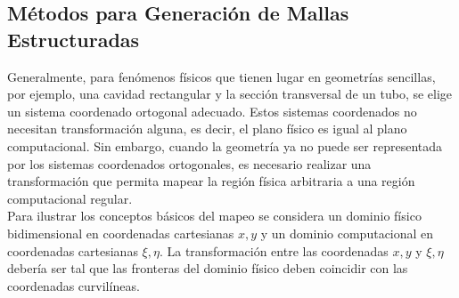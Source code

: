 \documentclass[11pt,letterpaper]{article}
\begin{document}
\subsection{Métodos para Generación de Mallas Estructuradas}

Generalmente, para fen\'omenos f\'isicos que tienen lugar en geometr\'ias sencillas, por ejemplo, una cavidad rectangular y la secci\'on transversal de un tubo, se elige un sistema coordenado ortogonal adecuado. Estos sistemas coordenados no necesitan transformación alguna, es decir, el plano físico es igual al plano computacional. Sin embargo, cuando la geometría ya no puede ser representada por los sistemas coordenados ortogonales, es necesario realizar una transformaci\'on que permita mapear la regi\'on f\'isica arbitraria a una regi\'on computacional regular.\\

Para ilustrar los conceptos b\'asicos del mapeo se considera un dominio físico bidimensional en coordenadas cartesianas $x,y$ y un dominio computacional en coordenadas cartesianas $\xi,\eta$. La transformaci\'on entre las coordenadas $x,y$ y $\xi,\eta$ debería ser tal que las fronteras del dominio f\'isico deben coincidir con las coordenadas curvil\'ineas.
\end{document}
